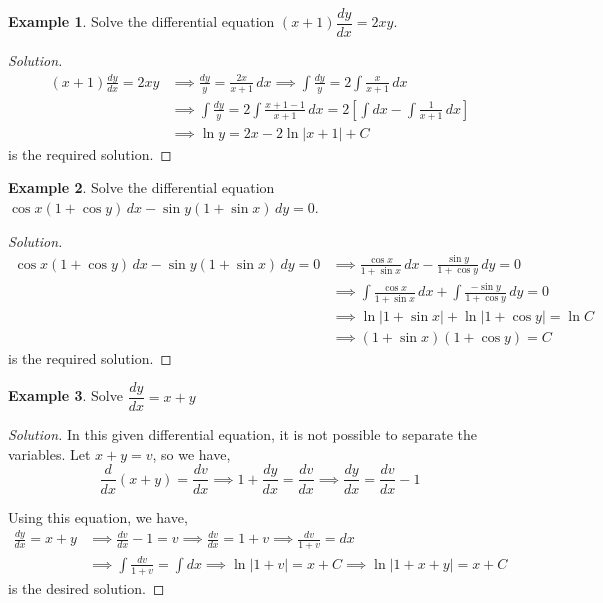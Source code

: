 \documentclass{book}
\theoremstyle{definition}
\newtheorem{example}{Example}[section]
\newenvironment{solution}
    {\begin{proof}[Solution]}
    {\end{proof}}
\begin{document}
\begin{example}
Solve the differential equation $(x+1)\dfrac{dy}{dx}=2xy$.    
\end{example}

\begin{solution}
\begin{align*}
(x+1)\frac{dy}{dx}=2xy &\implies \frac{dy}{y}=\frac{2x}{x+1}\,dx \implies \displaystyle\int\frac{dy}{y}=2\displaystyle\int\frac{x}{x+1}\,dx \\
&\implies \int\frac{dy}{y}=2 \int\frac{x+1-1}{x+1}\,dx=2\left[\int dx-\int\frac{1}{x+1}\,dx\right] \\
&\implies \ln y=2x-2\ln|x+1|+C
\end{align*}
is the required solution.
\end{solution}


\begin{example}
Solve the differential equation $\cos x(1+\cos y)\,dx-\sin y(1+\sin x)\,dy=0$.    
\end{example}

\begin{solution}
\begin{align*}
\cos x(1+\cos y)\,dx-\sin y(1+\sin x)\,dy=0 &\implies \frac{\cos x}{1+\sin x}\,dx-\frac{\sin y}{1+\cos y}\,dy=0 \\
&\implies \int\frac{\cos x}{1+\sin x}\,dx+\int\frac{-\sin y}{1+\cos y}\,dy=0 \\
&\implies \ln \left|1+\sin x\right|+\ln \left|1+\cos y\right|=\ln C \\
&\implies (1+\sin x)(1+\cos y)=C
\end{align*}    
is the required solution.
\end{solution}
\newpage
\begin{example}
Solve $\dfrac{dy}{dx}=x+y$    
\end{example}

\begin{solution}
In this given differential equation, it is not possible to separate the variables. Let $x+y=v$, so we have,
\[
\frac{d}{dx}(x+y)=\frac{dv}{dx} \implies 1+\frac{dy}{dx}=\frac{dv}{dx} \implies \frac{dy}{dx}=\frac{dv}{dx}-1
\]

Using this equation, we have, 
\begin{align*}
\frac{dy}{dx}=x+y &\implies \frac{dv}{dx}-1=v \implies \frac{dv}{dx}=1+v \implies\frac{dv}{1+v}=dx \\
&\implies \int\frac{dv}{1+v}=\int dx \implies \ln |1+v|=x+C \implies \ln |1+x+y|=x+C
\end{align*}
is the desired solution.
\end{solution}
\end{document}
